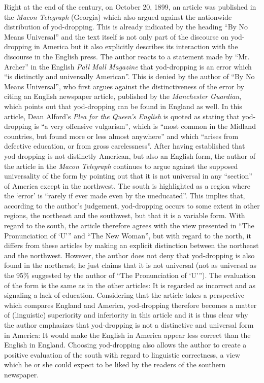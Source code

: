 Right at the end of the century, on October 20, 1899, an article was published in the \emph{Macon Telegraph} (Georgia) which also argued against the nationwide distribution of yod-dropping. This is already indicated by the heading “By No Means Universal” and the text itself is not only part of the discourse on yod-dropping in America but it also explicitly describes its interaction with the discourse in the English press. The author reacts to a statement made by “Mr. Archer” in the English \emph{Pall Mall Magazine} that yod-dropping is an error which “is distinctly and universally American”. This is denied by the author of “By No Means Universal”, who first argues against the distinctiveness of the error by citing an English newspaper article, published by the \emph{Manchester Guardian}, which points out that yod-dropping can be found in England as well. In this article, Dean Alford’s \emph{Plea for the Queen’s English} is quoted as stating that yod-dropping is “a very offensive vulgarism”, which is “most common in the Midland countries, but found more or less almost anywhere” and which “arises from defective education, or from gross carelessness”. After having established that yod-dropping is not distinctly American, but also an English form, the author of the article in the \emph{Macon Telegraph} continues to argue against the supposed universality of the form by pointing out that it is not universal in any “section” of America except in the northwest. The south is highlighted as a region where the ‘error’ is “rarely if ever made even by the uneducated”. This implies that, according to the author’s judgement, yod-dropping occurs to some extent in other regions, the northeast and the southwest, but that it is a variable form. With regard to the south, the article therefore agrees with the view presented in “The Pronunciation of ‘U’” and “The New Woman”, but with regard to the north, it differs from these articles by making an explicit distinction between the northeast and the northwest. However, the author does not deny that yod-dropping is also found in the northeast; he just claims that it is not universal (not as universal as the 95\% suggested by the author of “The Pronunciation of ‘U’”). The evaluation of the form is the same as in the other articles: It is regarded as incorrect and as signaling a lack of education. Considering that the article takes a perspective which compares England and America, yod-dropping therefore becomes a matter of (linguistic) superiority and inferiority in this article and it is thus clear why the author emphasizes that yod-dropping is not a distinctive and universal form in America: It would make the English in America appear less correct than the English in England. Choosing yod-dropping also allows the author to create a positive evaluation of the south with regard to linguistic correctness, a view which he or she could expect to be liked by the readers of the southern newspaper.

